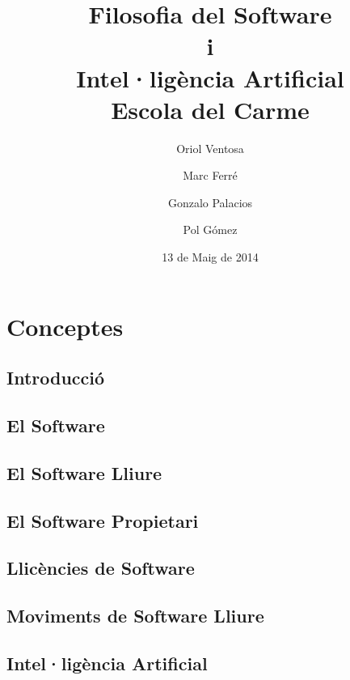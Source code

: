 \documentclass[a4paper,12pt]{report}
\begin{document}


\title{
	{\bf Filosofia del Software\\ i \\Intel·ligència Artificial} \\
	{\vspace{6mm}Escola del Carme}
}
\author{
	Oriol Ventosa \and
	Marc Ferré \and
	Gonzalo Palacios \and
	Pol Gómez
}
\date{13 de Maig de 2014}

\maketitle

\tableofcontents

\part{Conceptes}

\chapter{Introducció}


\chapter{El Software}


\chapter{El Software Lliure}


\chapter{El Software Propietari}


\chapter{Llicències de Software}


\chapter{Moviments de Software Lliure}


\chapter{Intel·ligència Artificial}

\end{document}
